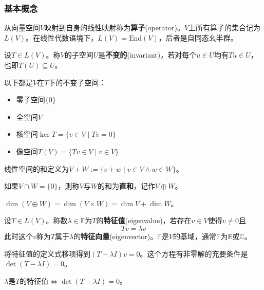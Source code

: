 \subsubsection{基本概念}
\begin{definition}[算子]
从向量空间$V$映射到自身的线性映射称为\textbf{算子}(operator)。$V$上所有算子的集合记为$L(V)$。在线性代数语境下，$L(V) = \text{End}(V)$，后者是自同态幺半群。
\end{definition}

\begin{definition}[不变子空间]
设$T \in L(V)$。称$V$的子空间$U$是\textbf{不变的}(invariant)，若对每个$u \in U$均有$Tu \in U$，也即$T(U) \subseteq U$。
\end{definition}

\begin{example}
以下都是$V$在$T$下的不变子空间：
\begin{itemize}
    \item 零子空间$\{0\}$
    \item 全空间$V$
    \item 核空间$\ker T = \{v \in V \mid Tv = 0\}$
    \item 像空间$T(V) = \{Tv \in V \mid v \in V\}$
\end{itemize}
\end{example}

\begin{definition}[直和]
线性空间的和定义为$V + W := \{v + w \mid v \in V \land w \in W\}$。

如果$V \cap W = \{0\}$，则称$V$与$W$的和为\textbf{直和}，记作$V \oplus W$。
\end{definition}

\begin{theorem}
$\dim(V \oplus W) = \dim(V \times W) = \dim V + \dim W$。
\end{theorem}

\begin{definition}
设$T \in L(V)$。称数$\lambda \in \mathbb{F}$为$T$的\textbf{特征值}(eigenvalue)，若存在$v \in V$使得$v \neq 0$且
\[
Tv = \lambda v
\]
此时这个$v$称为$T$属于$\lambda$的\textbf{特征向量}(eigenvector)。$\mathbb{F}$是$V$的基域，通常$\mathbb{F}$为$\mathbb{R}$或$\mathbb{C}$。
\end{definition}

将特征值的定义式移项得到$(T - \lambda I)v = 0$。这个方程有非零解的充要条件是$\det(T - \lambda I) = 0$。

\begin{theorem}
$\lambda$是$T$的特征值$\iff \det(T - \lambda I) = 0$。
\end{theorem}

